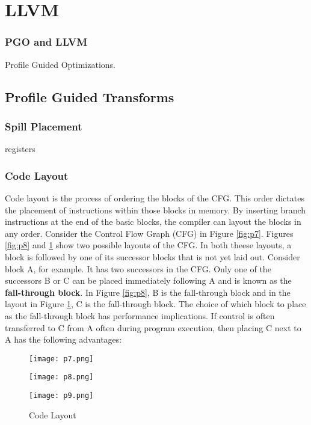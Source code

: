\section{LLVM}




\subsubsection{PGO and LLVM}

Profile Guided Optimizations.

\subsection{Profile Guided Transforms}

\subsubsection{Spill Placement}
registers

\subsubsection{Code Layout}

Code layout \cite{raman2022learning} is the process of ordering the blocks of the CFG. This order dictates the
placement of instructions within those blocks in memory. By inserting branch instructions at the end of the basic blocks,
the compiler can layout the blocks in any order.  Consider the
Control Flow Graph (CFG) in Figure \ref{fig:p7}. Figures \ref{fig:p8} and \ref{fig:p9}
show two possible layouts of the CFG. In both theese layouts,
a block is followed by one of its successor blocks that is
not yet laid out. Consider block A, for example. It has two
successors in the CFG. Only one of the successors B or C 
can be placed immediately following A and is known as the
\textbf{fall-through block}. In Figure \ref{fig:p8}, B is the fall-through block
and in the layout in Figure \ref{fig:p9}, C is the fall-through block.
The choice of which block to place as the fall-through block
has performance implications. If control is often transferred
to C from A often during program execution, then placing
C next to A has the following advantages:


\begin{figure}[!htb]
      \texttt{[image: p7.png]}
      \caption{CFG}\label{fig:p7}
    \endminipage\hfill
      \texttt{[image: p8.png]}
      \caption{Layout 1}\label{fig:p8}
    \endminipage\hfill
      \texttt{[image: p9.png]}
      \caption{Layout 2}\label{fig:p9}
    \endminipage\hfill
    \caption{Code Layout}
\end{figure}




